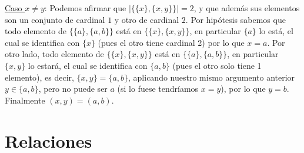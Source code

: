 \documentclass[dcc]{fcfmcourse}
\begin{document}
\begin{problems}
\underline{Caso $x \not= y$}:
Podemos afirmar que $|\{\{x\}, \{x, y\}\}| = 2$, y que además sus elementos son un conjunto de cardinal $1$ y otro de cardinal $2$.
Por hipótesis sabemos que todo elemento de $\{\{a\}, \{a, b\}\}$ está en $\{\{x\}, \{x, y\}\}$, en particular $\{a\}$ lo está, el cual se identifica con $\{x\}$ (pues el otro tiene cardinal 2) por lo que $x=a$. Por otro lado, todo elemento de $\{\{x\}, \{x, y\}\}$ está en $\{\{a\}, \{a, b\}\}$, en particular $\{x,y\}$ lo estará, el cual se identifica con $\{a,b\}$ (pues el otro solo tiene 1 elemento), es decir, $\{x,y\} = \{a,b\}$, aplicando nuestro mismo argumento anterior $y \in \{a,b\}$, pero no puede ser $a$ (si lo fuese tendríamos $x=y$), por lo que $y=b$. Finalmente $(x,y) = (a,b)$.
\end{problems}

\section*{Relaciones}
\end{document}
